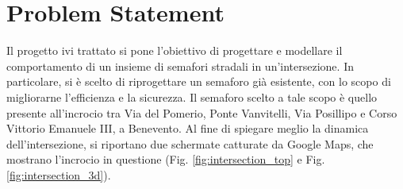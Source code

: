 \chapter*{Problem Statement}
\label{cap:problem-statement}

\rhead{\thepage}

Il progetto ivi trattato si pone l'obiettivo di progettare e modellare il comportamento di un insieme di semafori stradali in un'intersezione. In particolare, si è scelto di riprogettare un semaforo già esistente, con lo scopo di migliorarne l'efficienza e la sicurezza. Il semaforo scelto a tale scopo è quello presente all'incrocio tra Via del Pomerio, Ponte Vanvitelli, Via Posillipo e Corso Vittorio Emanuele III, a Benevento. Al fine di spiegare meglio la dinamica dell'intersezione, si riportano due schermate catturate da Google Maps, che mostrano l'incrocio in questione (Fig. \ref{fig:intersection_top} e Fig. \ref{fig:intersection_3d}).

